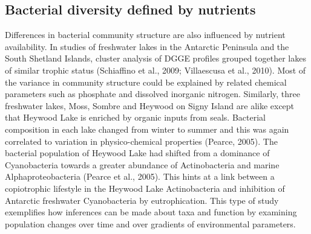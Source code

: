 \documentclass{book}
\begin{document}
\subsection{Bacterial diversity defined by nutrients}
Differences in bacterial community structure are also influenced by nutrient availability.
In studies of freshwater lakes in the Antarctic Peninsula and the South Shetland Islands, cluster analysis of DGGE profiles grouped together lakes of similar trophic status (Schiaffino et al., 2009; Villaescusa et al., 2010).
Most of the variance in community structure could be explained by related chemical parameters such as phosphate and dissolved inorganic nitrogen. Similarly, three freshwater lakes, Moss, Sombre and Heywood on Signy Island are alike except that Heywood Lake is enriched by organic inputs from seals.
Bacterial composition in each lake changed from winter to summer and this was again correlated to variation in physico-chemical properties (Pearce, 2005). 
The bacterial population of Heywood Lake had shifted from a dominance of Cyanobacteria towards a greater abundance of Actinobacteria and marine Alphaproteobacteria (Pearce et al., 2005).
This hints at a link between a copiotrophic lifestyle in the Heywood Lake Actinobacteria and inhibition of Antarctic freshwater Cyanobacteria by eutrophication. 
This type of study exemplifies how inferences can be made about taxa and function by examining population changes over time and over gradients of environmental parameters.
\end{document}
